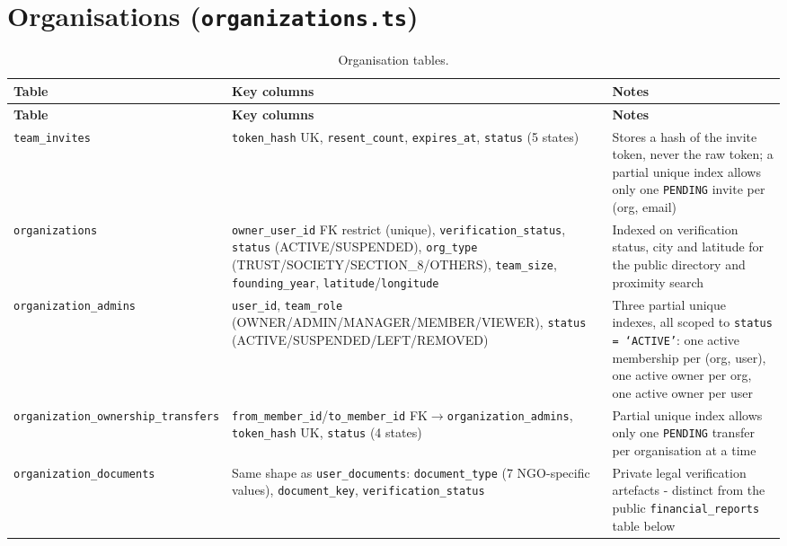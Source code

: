 \section{Organisations (\texttt{organizations.ts})}
\begin{longtable}{|>{\raggedright\arraybackslash}p{}|>{\raggedright\arraybackslash}p{}|>{\raggedright\arraybackslash}p{}|}
\caption{Organisation tables.}\\\hline
\textbf{Table} & \textbf{Key columns} & \textbf{Notes}\\\hline
\endfirsthead\hline\textbf{Table} & \textbf{Key columns} & \textbf{Notes}\\\hline\endhead
\texttt{team\_invites} & \texttt{token\_hash} UK, \texttt{resent\_count}, \texttt{expires\_at}, \texttt{status} (5 states) & Stores a hash of the invite token, never the raw token; a partial unique index allows only one \texttt{PENDING} invite per (org, email)\\\hline
\texttt{organizations} & \texttt{owner\_user\_id} FK restrict (unique), \texttt{verification\_status}, \texttt{status} (ACTIVE/\allowbreak SUSPENDED), \texttt{org\_type} (TRUST/\allowbreak SOCIETY/\allowbreak SECTION\_8/\allowbreak OTHERS), \texttt{team\_size}, \texttt{founding\_year}, \texttt{latitude}/\allowbreak\texttt{longitude} & Indexed on verification status, city and latitude for the public directory and proximity search\\\hline
\texttt{organization\_\allowbreak admins} & \texttt{user\_id}, \texttt{team\_role} (OWNER/\allowbreak ADMIN/\allowbreak MANAGER/\allowbreak MEMBER/\allowbreak VIEWER), \texttt{status} (ACTIVE/\allowbreak SUSPENDED/\allowbreak LEFT/\allowbreak REMOVED) & Three partial unique indexes, all scoped to \texttt{status = `ACTIVE'}: one active membership per (org, user), one active owner per org, one active owner per user\\\hline
\texttt{organization\_\allowbreak ownership\_\allowbreak transfers} & \texttt{from\_member\_id}/\texttt{to\_member\_id} FK$\to$\texttt{organization\_admins}, \texttt{token\_hash} UK, \texttt{status} (4 states) & Partial unique index allows only one \texttt{PENDING} transfer per organisation at a time\\\hline
\texttt{organization\_\allowbreak documents} & Same shape as \texttt{user\_documents}: \texttt{document\_type} (7 NGO-specific values), \texttt{document\_key}, \texttt{verification\_status} & Private legal verification artefacts - distinct from the public \texttt{financial\_reports} table below\\\hline
\end{longtable}

